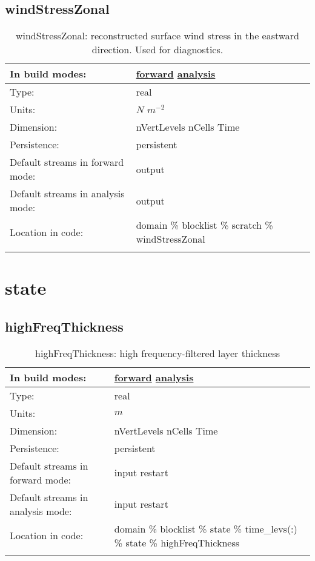 \subsection[windStressZonal]{windStressZonal}
\label{subsec:var_sec_scratch_windStressZonal}
\begin{center}
\begin{longtable}{| p{2.0in} | p{4.0in} |}
        \hline 
        In build modes: & \hyperref[subsec:forward_var_tab_scratch]{forward} \hyperref[subsec:analysis_var_tab_scratch]{analysis} \\
        \hline 
        Type: & real \\
        \hline 
        Units: & $N$ $m^{-2}$ \\
        \hline 
        Dimension: & nVertLevels nCells Time \\
        \hline 
        Persistence: & persistent \\
        \hline 
		 Default streams in forward mode: &  output \\
        \hline 
		 Default streams in analysis mode: &  output \\
        \hline 
		 Location in code: & domain \% blocklist \% scratch \% windStressZonal \\
		 \hline 
    \caption{windStressZonal: reconstructed surface wind stress in the eastward direction. Used for diagnostics.}
\end{longtable}
\end{center}
\section[state]{state}
\label{sec:var_sec_state}
\subsection[highFreqThickness]{highFreqThickness}
\label{subsec:var_sec_state_highFreqThickness}
\begin{center}
\begin{longtable}{| p{2.0in} | p{4.0in} |}
        \hline 
        In build modes: & \hyperref[subsec:forward_var_tab_state]{forward} \hyperref[subsec:analysis_var_tab_state]{analysis} \\
        \hline 
        Type: & real \\
        \hline 
        Units: & $m$ \\
        \hline 
        Dimension: & nVertLevels nCells Time \\
        \hline 
        Persistence: & persistent \\
        \hline 
		 Default streams in forward mode: &  input restart \\
        \hline 
		 Default streams in analysis mode: &  input restart \\
        \hline 
		 Location in code: & domain \% blocklist \% state \% time\_levs(:) \% state \% highFreqThickness \\
		 \hline 
    \caption{highFreqThickness: high frequency-filtered layer thickness}
\end{longtable}
\end{center}
